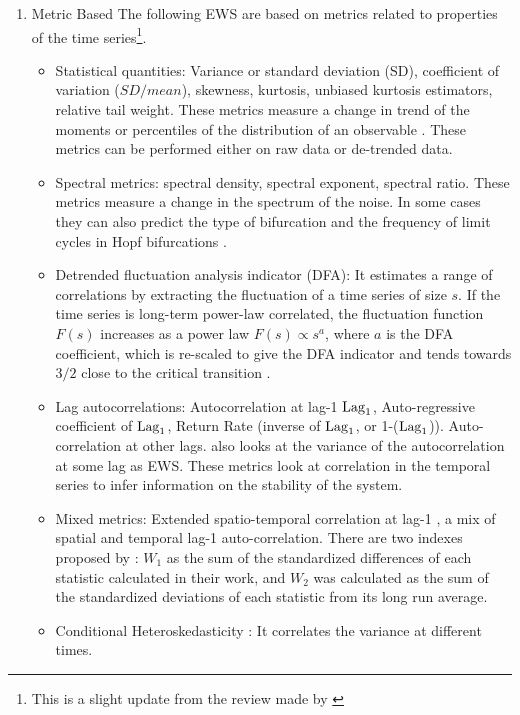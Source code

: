 \begin{enumerate}


\item{Metric Based}
The following EWS are based on  metrics related to  properties of the time series\footnote{This is a slight update from the review made by \cite{dakos2012_10.1371/journal.pone.0041010}}. 
\begin{itemize}
	\item Statistical quantities:  Variance or standard deviation (SD),  coefficient of variation ($SD/mean$), skewness, kurtosis, unbiased kurtosis estimators, relative tail weight.
	 These metrics measure a change in trend of the moments or percentiles of the distribution of an observable \citep{Xie2019,PhysRevE.100.013102,dakos2012_10.1371/journal.pone.0041010}.
	 These metrics can be performed either on raw data or de-trended data. 
	\item Spectral metrics: spectral density, spectral exponent, spectral ratio.
	These metrics measure a change in the spectrum of the noise. In some cases they can also predict the type of bifurcation and the frequency of limit cycles in Hopf bifurcations \citep{Bury2020}.
	\item Detrended fluctuation analysis indicator (DFA): It estimates a range of correlations by extracting the fluctuation of a time series of size $s$. If the time series is long-term power-law correlated, the fluctuation function $F(s)$ increases as a power law $F(s)\propto s^a$, where $a$ is the DFA coefficient, which is re-scaled to give the DFA indicator and tends towards $3/2$ close to the critical transition \citep{Peng1994,Livina2007}.
	\item Lag autocorrelations: Autocorrelation at lag-1 $\mathrm{Lag}_1$, Auto-regressive coefficient of $\mathrm{Lag}_1$, Return Rate (inverse of $\mathrm{Lag}_1$, or 1-($\mathrm{Lag}_1$)). Auto-correlation at other lags. \cite{Pavithran2021} also looks at the variance of the autocorrelation at some lag  as EWS.
	These metrics look at correlation in the temporal series to infer information on the stability of the system.
	\item Mixed metrics: Extended spatio-temporal correlation at lag-1 \citep{Tirabassi2022}, a mix of spatial and temporal lag-1 auto-correlation.
	There are two indexes proposed by \cite{Drake2010}: $W_1$ as the sum of the
	standardized differences of each statistic calculated in their work, and $W_2$ was
	calculated as the sum of the standardized deviations of each statistic from its long run average. 
	\item Conditional Heteroskedasticity \citep{Seekell2011}: It correlates the variance at different times.

\end{itemize}
\end{enumerate}
